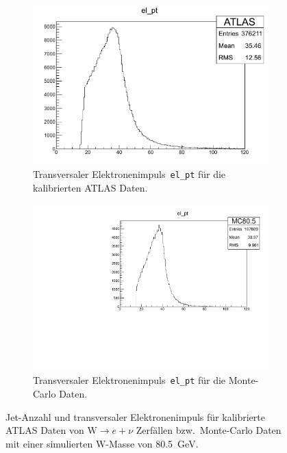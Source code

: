 \documentclass[11pt, a4paper]{article}
\numberwithin{equation}{section}
\begin{document}
\begin{figure}
\begin{subfigure}{.49\textwidth}
	\end{subfigure}
	\begin{subfigure}{.49\textwidth}
		\centering
		\includegraphics[width=.7\textwidth]{./data/root/wmass/exercise1/ATLAS_el_pt.pdf}
		\caption{Transversaler Elektronenimpuls~\texttt{el\_pt} für die kalibrierten ATLAS Daten.}
	\end{subfigure}
	\begin{subfigure}{.49\textwidth}
		\centering
		\includegraphics[width=.7\textwidth]{./data/root/wmass/exercise1/MC_el_pt.pdf}
		\caption{Transversaler Elektronenimpuls~\texttt{el\_pt} für die Monte-Carlo Daten.}
	\end{subfigure}
	\caption{Jet-Anzahl und transversaler Elektronenimpuls für kalibrierte ATLAS Daten von $\mathrm{W} \rightarrow e + \nu$ Zerfällen bzw.\ Monte-Carlo Daten mit einer simulierten W-Masse von \SI{80,5}{GeV}.}
	\label{fig:observablen_pt1}
\end{figure}
\end{document}
